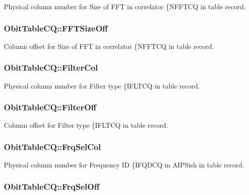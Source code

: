 Physical column number for Size of FFT in correlator \{NFFTCQ in table record. 

\subsubsection{ {\bf Obit\-Table\-CQ::FFTSize\-Off}}\label{structObitTableCQ_o21}


Column offset for Size of FFT in correlator \{NFFTCQ in table record. 

\subsubsection{ {\bf Obit\-Table\-CQ::Filter\-Col}}\label{structObitTableCQ_o38}


Physical column number for Filter type \{IFLTCQ in table record. 

\subsubsection{ {\bf Obit\-Table\-CQ::Filter\-Off}}\label{structObitTableCQ_o37}


Column offset for Filter type \{IFLTCQ in table record. 

\subsubsection{ {\bf Obit\-Table\-CQ::Frq\-Sel\-Col}}\label{structObitTableCQ_o18}


Physical column number for Frequency ID \{IFQDCQ in AIPSish in table record. 

\subsubsection{ {\bf Obit\-Table\-CQ::Frq\-Sel\-Off}}\label{structObitTableCQ_o17}



